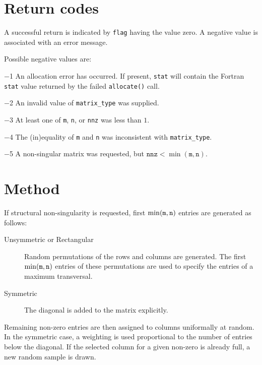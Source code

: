 
\section{Return codes} \label{errors}

A successful return is indicated by
{\tt flag} having the value zero.
A negative value is associated with an error message.

Possible negative values are:

\begin{description}
\item{$-$1} An allocation error has occurred. If present, {\tt stat} will
   contain the Fortran {\tt stat} value returned by the failed {\tt allocate()}
   call.
\item{$-$2} An invalid value of {\tt matrix\_type} was supplied.
\item{$-$3} At least one of {\tt m}, {\tt n}, or {\tt nnz} was less than $1$.
\item{$-$4} The (in)equality of {\tt m} and {\tt n} was inconsistent with
   {\tt matrix\_type}.
\item{$-$5} A non-singular matrix was requested, but $\texttt{nnz}<\min(\texttt{m},\texttt{n})$.
\end{description}

\section{Method} \label{method}

If structural non-singularity is requested, first $\min({\tt m}, {\tt n})$ entries are generated as follows:
\begin{description}
   \item[Unsymmetric or Rectangular] Random permutations of the rows and
      columns are generated. The first $\min({\tt m}, {\tt n})$ entries of
      these permutations are used to specify the entries of a maximum
      transversal.
   \item[Symmetric] The diagonal is added to the matrix explicitly.
\end{description}

Remaining non-zero entries are then assigned to columns uniformally at
random. In the symmetric case, a weighting is used proportional to the number of
entries below the diagonal. If the selected column for a given non-zero is 
already full, a new random sample is drawn.

